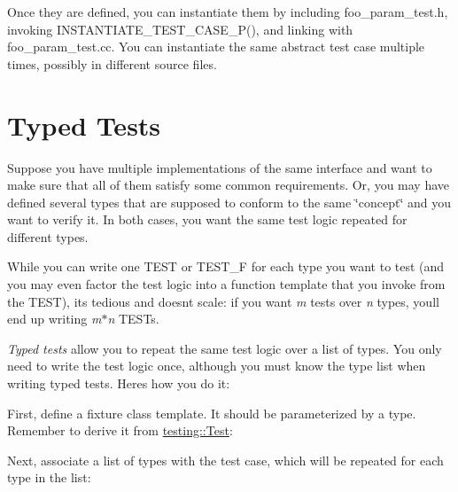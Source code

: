 Once they are defined, you can instantiate them by including {\ttfamily foo\+\_\+param\+\_\+test.\+h}, invoking {\ttfamily I\+N\+S\+T\+A\+N\+T\+I\+A\+T\+E\+\_\+\+T\+E\+S\+T\+\_\+\+C\+A\+S\+E\+\_\+\+P()}, and linking with {\ttfamily foo\+\_\+param\+\_\+test.\+cc}. You can instantiate the same abstract test case multiple times, possibly in different source files.

\section*{Typed Tests}

Suppose you have multiple implementations of the same interface and want to make sure that all of them satisfy some common requirements. Or, you may have defined several types that are supposed to conform to the same \char`\"{}concept\char`\"{} and you want to verify it. In both cases, you want the same test logic repeated for different types.

While you can write one {\ttfamily T\+E\+ST} or {\ttfamily T\+E\+S\+T\+\_\+F} for each type you want to test (and you may even factor the test logic into a function template that you invoke from the {\ttfamily T\+E\+ST}), it\textquotesingle{}s tedious and doesn\textquotesingle{}t scale\+: if you want {\itshape m} tests over {\itshape n} types, you\textquotesingle{}ll end up writing {\itshape m$\ast$n} {\ttfamily T\+E\+ST}s.

{\itshape Typed tests} allow you to repeat the same test logic over a list of types. You only need to write the test logic once, although you must know the type list when writing typed tests. Here\textquotesingle{}s how you do it\+:

First, define a fixture class template. It should be parameterized by a type. Remember to derive it from {\ttfamily \mbox{\hyperlink{classtesting_1_1_test}{testing\+::\+Test}}}\+:


\begin{DoxyCode}{0}
\DoxyCodeLine{\};}
\end{DoxyCode}


Next, associate a list of types with the test case, which will be repeated for each type in the list\+:


\begin{DoxyCode}{0}
\end{DoxyCode}


